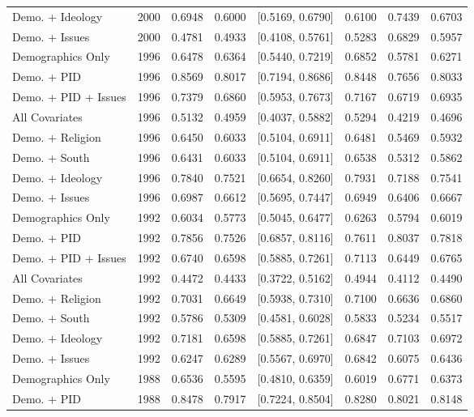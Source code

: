 \begin{longtable}{lrrrlrrr}
  Demo. + Ideology & 2000 & 0.6948 & 0.6000 & [0.5169, 0.6790] & 0.6100 & 0.7439 & 0.6703 \\ 
  Demo. + Issues & 2000 & 0.4781 & 0.4933 & [0.4108, 0.5761] & 0.5283 & 0.6829 & 0.5957 \\ 
  Demographics Only & 1996 & 0.6478 & 0.6364 & [0.5440, 0.7219] & 0.6852 & 0.5781 & 0.6271 \\ 
  Demo. + PID & 1996 & 0.8569 & 0.8017 & [0.7194, 0.8686] & 0.8448 & 0.7656 & 0.8033 \\ 
  Demo. + PID + Issues & 1996 & 0.7379 & 0.6860 & [0.5953, 0.7673] & 0.7167 & 0.6719 & 0.6935 \\ 
  All Covariates & 1996 & 0.5132 & 0.4959 & [0.4037, 0.5882] & 0.5294 & 0.4219 & 0.4696 \\ 
  Demo. + Religion & 1996 & 0.6450 & 0.6033 & [0.5104, 0.6911] & 0.6481 & 0.5469 & 0.5932 \\ 
  Demo. + South & 1996 & 0.6431 & 0.6033 & [0.5104, 0.6911] & 0.6538 & 0.5312 & 0.5862 \\ 
  Demo. + Ideology & 1996 & 0.7840 & 0.7521 & [0.6654, 0.8260] & 0.7931 & 0.7188 & 0.7541 \\ 
  Demo. + Issues & 1996 & 0.6987 & 0.6612 & [0.5695, 0.7447] & 0.6949 & 0.6406 & 0.6667 \\ 
  Demographics Only & 1992 & 0.6034 & 0.5773 & [0.5045, 0.6477] & 0.6263 & 0.5794 & 0.6019 \\ 
  Demo. + PID & 1992 & 0.7856 & 0.7526 & [0.6857, 0.8116] & 0.7611 & 0.8037 & 0.7818 \\ 
  Demo. + PID + Issues & 1992 & 0.6740 & 0.6598 & [0.5885, 0.7261] & 0.7113 & 0.6449 & 0.6765 \\ 
  All Covariates & 1992 & 0.4472 & 0.4433 & [0.3722, 0.5162] & 0.4944 & 0.4112 & 0.4490 \\ 
  Demo. + Religion & 1992 & 0.7031 & 0.6649 & [0.5938, 0.7310] & 0.7100 & 0.6636 & 0.6860 \\ 
  Demo. + South & 1992 & 0.5786 & 0.5309 & [0.4581, 0.6028] & 0.5833 & 0.5234 & 0.5517 \\ 
  Demo. + Ideology & 1992 & 0.7181 & 0.6598 & [0.5885, 0.7261] & 0.6847 & 0.7103 & 0.6972 \\ 
  Demo. + Issues & 1992 & 0.6247 & 0.6289 & [0.5567, 0.6970] & 0.6842 & 0.6075 & 0.6436 \\ 
  Demographics Only & 1988 & 0.6536 & 0.5595 & [0.4810, 0.6359] & 0.6019 & 0.6771 & 0.6373 \\ 
  Demo. + PID & 1988 & 0.8478 & 0.7917 & [0.7224, 0.8504] & 0.8280 & 0.8021 & 0.8148 \\ 

\end{longtable}
